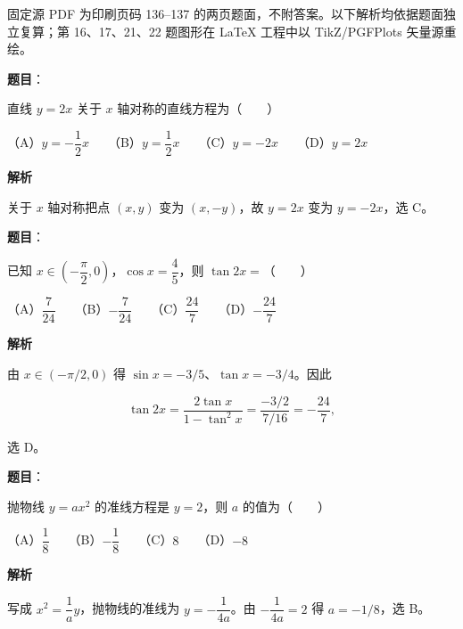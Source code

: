 

\begin{gktip}
固定源 PDF 为印刷页码 136–137 的两页题面，不附答案。以下解析均依据题面独立复算；第 16、17、21、22 题图形在 LaTeX 工程中以 TikZ/PGFPlots 矢量源重绘。
\end{gktip}


\begin{answer}

\textbf{题目}：

直线 $y=2x$ 关于 $x$ 轴对称的直线方程为\mbox{（　　）}

（A）$y=-\dfrac12x$　　（B）$y=\dfrac12x$　　（C）$y=-2x$　　（D）$y=2x$

\textbf{解析}

关于 $x$ 轴对称把点 $(x,y)$ 变为 $(x,-y)$，故 $y=2x$ 变为 $y=-2x$，选 C。


\end{answer}
\begin{answer}

\textbf{题目}：

已知 $x\in\left(-\dfrac\pi2,0\right)$，$\cos x=\dfrac45$，则 $\tan2x=$\mbox{（　　）}

（A）$\dfrac7{24}$　　（B）$-\dfrac7{24}$　　（C）$\dfrac{24}{7}$　　（D）$-\dfrac{24}{7}$

\textbf{解析}

由 $x\in(-\pi/2,0)$ 得 $\sin x=-3/5$、$\tan x=-3/4$。因此

\nopagebreak[4]
\[
\tan2x=\frac{2\tan x}{1-\tan^2x}
=\frac{-3/2}{7/16}=-\frac{24}{7},
\]

选 D。


\end{answer}
\begin{answer}

\textbf{题目}：

抛物线 $y=ax^2$ 的准线方程是 $y=2$，则 $a$ 的值为\mbox{（　　）}

（A）$\dfrac18$　　（B）$-\dfrac18$　　（C）$8$　　（D）$-8$

\textbf{解析}

写成 $x^2=\dfrac1a y$，抛物线的准线为 $y=-\dfrac1{4a}$。由 $-\dfrac1{4a}=2$ 得 $a=-1/8$，选 B。


\end{answer}
